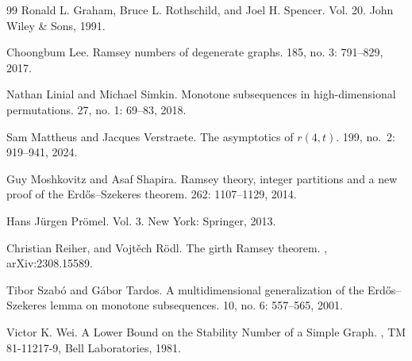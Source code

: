 \documentclass[11pt]{article}
\theoremstyle{definition}
\numberwithin{equation}{section}
\numberwithin{figure}{section}
\begin{document}
\begin{thebibliography}{99}
Ronald L. Graham, Bruce L. Rothschild, and Joel H. Spencer. 
 Vol. 20. John Wiley \& Sons, 1991.


Choongbum Lee. 
\newblock Ramsey numbers of degenerate graphs.
 185, no. 3: 791--829, 2017.

Nathan Linial and Michael Simkin. 
\newblock Monotone subsequences in high-dimensional permutations. 
 27, no. 1: 69--83, 2018.

Sam Mattheus and Jacques Verstraete. 
\newblock The asymptotics of $r(4,t)$.
 199, no.~2: 919–941,  2024.


Guy Moshkovitz and Asaf Shapira. 
\newblock Ramsey theory, integer partitions and a new proof of the Erdős–Szekeres theorem. 
 262: 1107--1129, 2014.

Hans Jürgen Prömel. 
 Vol. 3. New York: Springer, 2013.

Christian Reiher, and Vojt\v{e}ch R\"odl. 
\newblock The girth Ramsey theorem.
, arXiv:2308.15589.

Tibor Szab\'{o} and G\'{a}bor Tardos. 
\newblock A multidimensional generalization of the Erd\H{o}s–Szekeres lemma on monotone subsequences.
 10, no. 6: 557--565, 2001.

Victor K. Wei. 
\newblock A Lower Bound on the Stability Number of a Simple Graph.
, TM 81-11217-9, Bell Laboratories, 1981.

\end{thebibliography}
\end{document}
